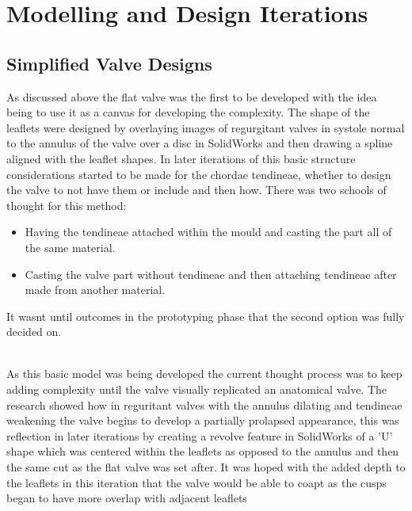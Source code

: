 \section{Modelling and Design Iterations}

\subsection{Simplified Valve Designs}

As discussed above  the flat valve was the first to be developed with the idea being to use it as a canvas for developing the complexity. The shape of the leaflets were designed by overlaying images of regurgitant valves in systole normal to the annulus of the valve over a disc in SolidWorks and then drawing a spline aligned with the leaflet shapes.
In later iterations of this basic structure considerations started to be made for the chordae tendineae, whether to design the valve to not have them or include and then how. There was two schools of thought for this method:
\begin{itemize}
    \item Having the tendineae attached within the mould and casting the part all of the same material.
    \item Casting the valve part without tendineae and then attaching tendineae after made from another material.
\end{itemize}
It wasnt until outcomes in the prototyping phase  that the second option was fully decided on.

\\
As this basic model was being developed the current thought process was to keep adding complexity until the valve visually replicated an anatomical valve.
The research  showed how in reguritant valves with the annulus dilating and tendineae weakening the valve begins to develop a partially prolapsed appearance, this was reflection in later iterations by creating a revolve feature in SolidWorks of a 'U' shape which was centered within the leaflets as opposed to the annulus and then the same cut as the flat valve was set after.
It was hoped with the added depth to the leaflets in this iteration that the valve would be able to coapt as the cusps began to have more overlap with adjacent leaflets

